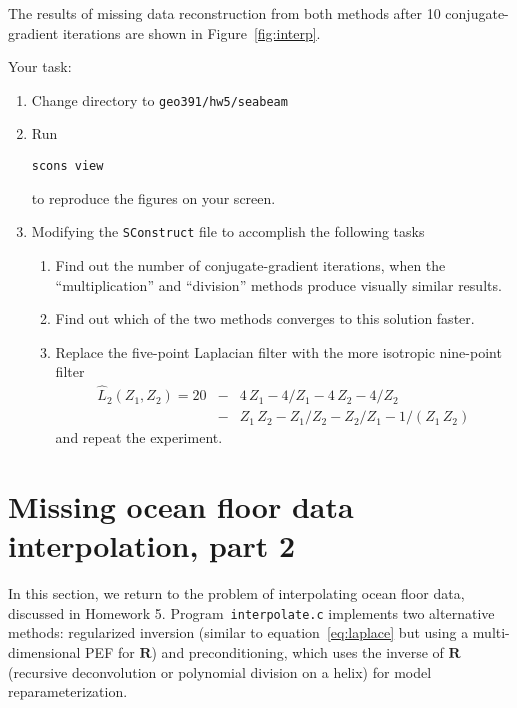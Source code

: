 The results of missing data reconstruction from both methods after 10 conjugate-gradient iterations are shown in Figure~\ref{fig:interp}.


Your task:
\begin{enumerate}
\item Change directory to \verb#geo391/hw5/seabeam#
\item Run 
\begin{verbatim}
scons view
\end{verbatim}
to reproduce the figures on your screen.
\item Modifying the \texttt{SConstruct} file to accomplish the following tasks
\begin{enumerate}
\item Find out the number of conjugate-gradient iterations, when the ``multiplication'' and ``division'' methods produce visually similar results.
\item Find out which of the two methods converges to this solution faster.
\item Replace the five-point Laplacian filter with the more isotropic nine-point filter 
\begin{eqnarray}
\nonumber
\hat{L}_2(Z_1,Z_2) = 20 & - & 4\,Z_1 - 4/Z_1 - 4\,Z_2 - 4/Z_2 \\
& - & Z_1\,Z_2 - Z_1/Z_2 - Z_2/Z_1 - 1/(Z_1\,Z_2)
\label{eq:lap9}
\end{eqnarray}
and repeat the experiment.
\end{enumerate}
\end{enumerate}

\lstset{language=python,numbers=left,numberstyle=\tiny,showstringspaces=false}


\section{Missing ocean floor data interpolation, part 2}

In this section, we return to the problem of interpolating ocean floor
data, discussed in Homework 5. Program~\texttt{interpolate.c}
implements two alternative methods: regularized inversion (similar to
equation~\ref{eq:laplace} but using a multi-dimensional PEF for
$\mathbf{R}$) and preconditioning, which uses the inverse of
$\mathbf{R}$ (recursive deconvolution or polynomial division on a
helix) for model reparameterization.

